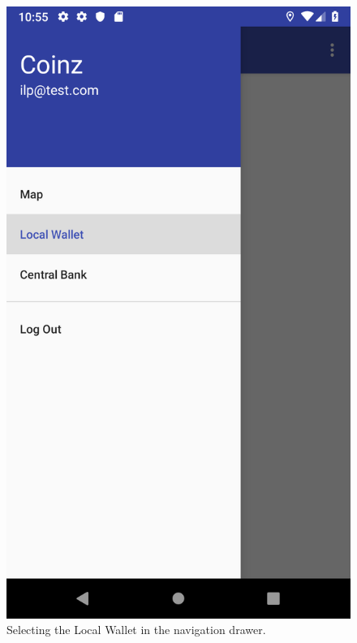 \documentclass[11pt,a4paper,notitlepage]{article}
\begin{document}
\begin{figure}[H]
    \centering
    \begin{minipage}[t]{0.48\textwidth}
        \includegraphics[scale=0.2]{screenshots/local-wallet/selected-empty-local-wallet.png}
        \caption{Selecting the Local Wallet in the navigation drawer.}
    \end{minipage}
    \begin{minipage}[t]{0.48\textwidth}

\end{minipage}
\end{figure}
\end{document}
